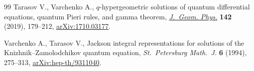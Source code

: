 \documentclass[pdftex]{sigma}
\numberwithin{equation}{section}
\begin{document}
\begin{thebibliography}{99}
Tarasov V., Varchenko A., {$q$}-hypergeometric solutions of quantum
 differential equations, quantum {P}ieri rules, and gamma theorem,
 \href{https://doi.org/10.1016/j.geomphys.2019.04.005}{\textit{J.~Geom.
 Phys.}} \textbf{142} (2019), 179--212,
 \href{http://arxiv.org/abs/1710.03177}{arXiv:1710.03177}.

Varchenko A., Tarasov V., Jackson integral representations for solutions of the
 {K}nizhnik--{Z}amolodchikov quantum equation, \textit{St.~Petersburg
 Math.~J.} \textbf{6} (1994), 275--313,
 \href{http://arxiv.org/abs/hep-th/9311040}{arXiv:hep-th/9311040}.

\end{thebibliography}\LastPageEnding
\end{document}
